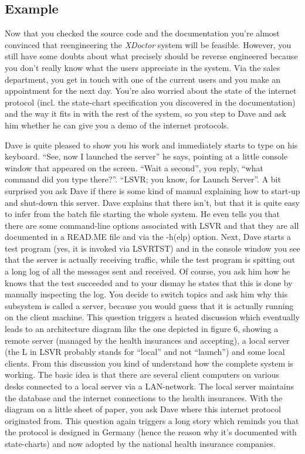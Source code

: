 \documentclass[a4paper,10pt,twoside]{book}
\begin{document}
\subsection*{Example}

Now that you checked the source code and the documentation you're almost convinced that reengineering the \emph{XDoctor} system will be feasible. However, you still have some doubts about what precisely should be reverse engineered because you don't really know what the users appreciate in the system. Via the sales department, you get in touch with one of the current users and you make an appointment for the next day. You're also worried about the state of the internet protocol (incl. the state-chart specification you discovered in the documentation) and the way it fits in with the rest of the system, so you step to Dave and ask him whether he can give you a demo of the internet protocols.

Dave is quite pleased to show you his work and immediately starts to type on his keyboard. ``See, now I launched the server'' he says, pointing at a little console window that appeared on the screen. ``Wait a second'', you reply, ``what command did you type there?''. ``LSVR; you know, for Launch Server''. A bit surprised you ask Dave if there is some kind of manual explaining how to start-up and shut-down this server. Dave explains that there isn't, but that it is quite easy to infer from the batch file starting the whole system. He even tells you that there are some command-line options associated with LSVR and that they are all documented in a READ.ME file and via the -h(elp) option. Next, Dave starts a test program (yes, it is invoked via LSVRTST) and in the console window you see that the server is actually receiving traffic, while the test program is spitting out a long log of all the messages sent and received. Of course, you ask him how he knows that the test succeeded and to your dismay he states that this is done by manually inspecting the log. You decide to switch topics and ask him why this subsystem is called a server, because you would guess that it is actually running on the client machine. This question triggers a heated discussion which eventually leads to an architecture diagram like the one depicted in figure 6, showing a remote server (managed by the health insurances and accepting), a local server (the L in LSVR probably stands for ``local'' and not ``launch'') and some local clients. From this discussion you kind of understand how the complete system is working. The basic idea is that there are several client computers on various desks connected to a local server via a LAN-network. The local server maintains the database and the internet connections to the health insurances. With the diagram on a little sheet of paper, you ask Dave where this internet protocol originated from. This question again triggers a long story which reminds you that the protocol is designed in Germany (hence the reason why it's documented with state-charts) and now adopted by the national health insurance companies.
\end{document}
